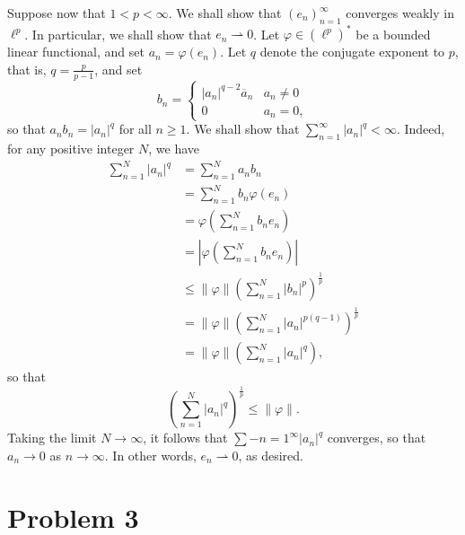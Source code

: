 \documentclass[11pt]{article}
\theoremstyle{thmstyle}
\theoremstyle{defstyle}
\newcommand{\weakto}{\rightharpoonup}
\renewcommand{\le}{\leqslant}
\renewcommand{\ge}{\geqslant}
\begin{document}
Suppose now that $1 < p < \infty$. We shall show that $(e_n)_{n = 1}^\infty$ converges weakly in $\ell^p$. In particular, we shall show that $e_n\weakto 0$. Let $\varphi\in\left(\ell^p\right)^\ast$ be a bounded linear functional, and set $a_n = \varphi(e_n)$. Let $q$ denote the conjugate exponent to $p$, that is, $q = \frac{p}{p - 1}$, and set 
\begin{equation*}
    b_n = \begin{cases}
        |a_n|^{q - 2}\overline a_n & a_n\ne 0\\
        0 & a_n = 0,
    \end{cases}
\end{equation*}
so that $a_nb_n = |a_n|^{q}$ for all $n\ge 1$.
We shall show that $\displaystyle\sum_{n = 1}^\infty |a_n|^{q} < \infty$. Indeed, for any positive integer $N$, we have 
\begin{align*}
    \sum_{n = 1}^N |a_n|^q &= \sum_{n = 1}^N a_nb_n\\ &= \sum_{n = 1}^N b_n\varphi(e_n)\\ &= \varphi\left(\sum_{n = 1}^N b_ne_n\right)\\ &= \left|\varphi\left(\sum_{n = 1}^N b_ne_n\right)\right|\\ &\le\|\varphi\|\left(\sum_{n = 1}^N |b_n|^p\right)^{\frac{1}{p}}\\ &= \|\varphi\|\left(\sum_{n = 1}^N |a_n|^{p(q - 1)}\right)^{\frac{1}{p}}\\
    &= \|\varphi\|\left(\sum_{n = 1}^N |a_n|^q\right),
\end{align*}
so that 
\begin{equation*}
    \left(\sum_{n = 1}^N |a_n|^q\right)^{\frac{1}{p}}\le\|\varphi\|.
\end{equation*}
Taking the limit $N\to\infty$, it follows that $\displaystyle\sum-{n = 1}^\infty |a_n|^q$ converges, so that $a_n\to 0$ as $n\to\infty$. In other words, $e_n\weakto 0$, as desired.

\section{Problem 3}
\end{document}
